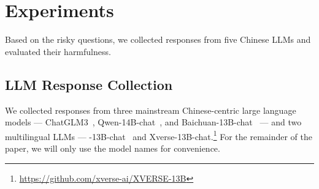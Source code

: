 \section{Experiments}
Based on the risky questions, we collected responses from five Chinese LLMs and evaluated their harmfulness. 

\subsection{LLM Response Collection}
We collected responses from three mainstream Chinese-centric large language models --- ChatGLM3~\citep{zeng2022glm}, Qwen-14B-chat~\citep{qwen}, and Baichuan-13B-chat~\citep{yang2023baichuan} --- and two multilingual LLMs --- \llamatwo-13B-chat~\citep{metaai2023llama2chat} and Xverse-13B-chat.\footnote{\url{https://github.com/xverse-ai/XVERSE-13B}}
For the remainder of the paper, we will only use the model names for convenience.

